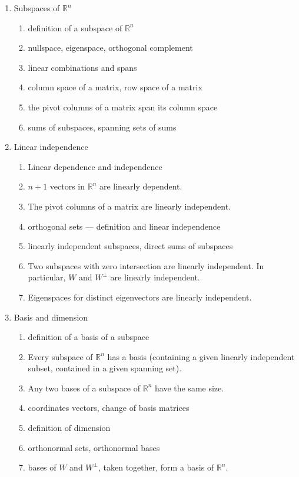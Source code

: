 \documentclass{amsart}
\newcommand{\RR}{\mathbb{R}}
\begin{document}
\setlength{\parskip}{0.5em}
\setlength{\parindent}{0em}
\begin{enumerate}
  \item Subspaces of $\RR^n$
  \begin{enumerate}
\item definition of a subspace of $\RR^n$
\item nullspace, eigenspace, orthogonal complement
\item linear combinations and spans
\item column space of a matrix, row space of a matrix
\item the pivot columns of a matrix span its column space
\item sums of subspaces, spanning sets of sums
  \end{enumerate}
  \item Linear independence
  \begin{enumerate}
   \item Linear dependence and independence
   \item $n+1$ vectors in $\RR^n$ are linearly dependent.
   \item The pivot columns of a matrix are linearly independent.
   \item orthogonal sets --- definition and linear independence
   \item linearly independent subspaces, direct sums of subspaces
   \item Two subspaces with zero intersection are linearly independent. In particular, $W$ and $W^\perp$ are linearly independent.
   \item Eigenspaces for distinct eigenvectors are linearly independent.
  \end{enumerate}
  \item Basis and dimension
  \begin{enumerate}
   \item definition of a basis of a subspace
   \item Every subspace of $\RR^n$ has a basis (containing a given linearly independent subset, contained in a given spanning set).
   \item Any two bases of a subspace of $\RR^n$ have the same size.
   \item coordinates vectors, change of basis matrices
   \item definition of dimension
   \item orthonormal sets, orthonormal bases
   \item bases of $W$ and $W^\perp$, taken together, form a basis of $\RR^n$.

\end{enumerate}
\end{enumerate}
\end{document}
